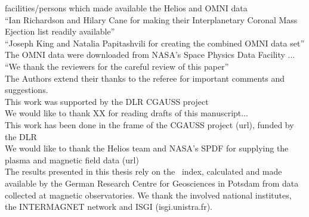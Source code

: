 facilities/persons which made available the Helios and OMNI data\\
``Ian Richardson and Hilary Cane for making their Interplanetary Coronal Mass Ejection list readily available''\\
``Joseph King and Natalia Papitashvili for creating the combined OMNI data set''\\
The OMNI data were downloaded from NASA's Space Physics Data Facility ...\\
``We thank the reviewers for the careful review of this paper''\\
The Authors extend their thanks to the referee for important comments and suggestions.\\
This work was supported by the DLR CGAUSS project\\
We would like to thank XX for reading drafts of this manuscript...\\
This work has been done in the frame of the CGAUSS project (url), funded by the DLR\\
We would like to thank the Helios team and NASA's SPDF for supplying the plasma and magnetic field data (url)\\


The results presented in this thesis rely on the \Kp{}~index, calculated and made available by the German Research Centre for Geosciences in Potsdam from data collected at magnetic observatories. We thank the involved national institutes, the INTERMAGNET network and ISGI (isgi.unistra.fr).\\
